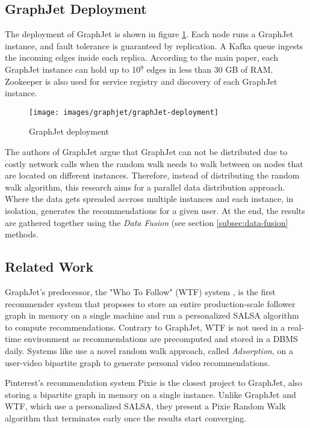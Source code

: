 \subsection{GraphJet Deployment}
\label{subsec:GraphJet-Deployment}
The deployment of GraphJet is shown in figure \ref{fig:graphJet-deployment}. Each node runs a GraphJet instance, and fault tolerance is guaranteed by replication. A Kafka queue ingests the incoming edges inside each replica. According to the main paper, each GraphJet instance can hold up to 10$^9$ edges in less than 30 GB of RAM. Zookeeper is also used for service registry and discovery of each GraphJet instance.
\begin{figure}[!htb]
    \centering
    \texttt{[image: images/graphjet/graphJet-deployment]}
    \caption{GraphJet deployment \cite{sharmaGraphJetRealtimeContent2016}}
    \label{fig:graphJet-deployment}
\end{figure}

The authors of GraphJet argue that GraphJet can not be distributed due to costly network calls when the random walk needs to walk between on nodes that are located on different instances. Therefore, instead of distributing the random walk algorithm, this research aims for a parallel data distribution approach. Where the data gets spreaded accross multiple instances and each instance, in isolation, generates the recommendations for a given user. At the end, the results are gathered together using the \emph{Data Fusion} (see section \ref{subsec:data-fusion} methods.

\subsection{Related Work}
\label{subsec:graphjet-related-work}
GraphJet's predecessor, the "Who To Follow" (WTF) system \cite{guptaWTFWhoFollow2013}, is the first recommender system that proposes to store an entire production-scale follower graph in memory on a single machine and run a personalized SALSA algorithm to compute recommendations. Contrary to GraphJet, WTF is not used in a real-time environment as recommendations are precomputed and stored in a DBMS daily. Systems like \cite{balujaVideoSuggestionDiscovery2008} use a novel random walk approach, called \emph{Adsorption}, on a user-video bipartite graph to generate personal video recommendations.


Pinterest's recommendation system Pixie \cite{eksombatchaiPixieSystemRecommending2018} is the closest project to GraphJet, also storing a bipartite graph in memory on a single instance. Unlike GraphJet and WTF, which use a personalized SALSA, they present a Pixie Random Walk algorithm that terminates early once the results start converging.
